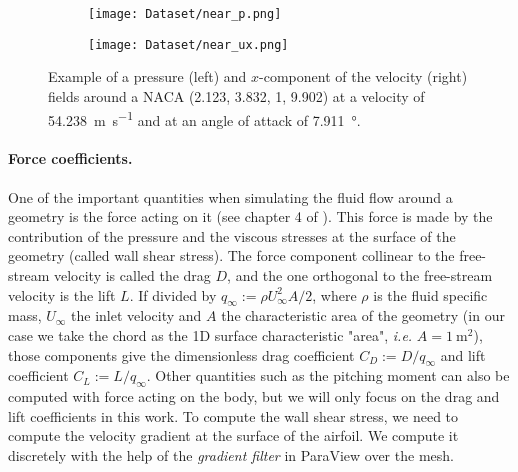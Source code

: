 \begin{figure}
	\centering
	\begin{subfigure}{0.49\textwidth}
		\centering
		\texttt{[image: Dataset/near\_p.png]}
	\end{subfigure}
	\begin{subfigure}{0.49\textwidth}
		\centering
		\texttt{[image: Dataset/near\_ux.png]}
	\end{subfigure}
	\caption{Example of a pressure (left) and $x$-component of the velocity (right) fields around a NACA (2.123, 3.832, 1, 9.902) at a velocity of \SI{54.238}{\meter\per\second} and at an angle of attack of \SI{7.911}{\degree}.}
	\label{fig:NACA_field}
\end{figure}

\paragraph{Force coefficients.} One of the important quantities when simulating the fluid flow around a geometry is the force acting on it (see chapter 4 of \cite{aero}). This force is made by the contribution of the pressure and the viscous stresses at the surface of the geometry (called wall shear stress). The force component collinear to the free-stream velocity is called the drag $D$, and the one orthogonal to the free-stream velocity is the lift $L$. If divided by $q_\infty := \rho U_\infty^2 A/2$, where $\rho$ is the fluid specific mass, $U_\infty$ the inlet velocity and $A$ the characteristic area of the geometry (in our case we take the chord as the 1D surface characteristic "area", \emph{i.e.} $A = \SI{1}{\square\meter}$), those components give the dimensionless drag coefficient $C_D := D/q_\infty$ and lift coefficient $C_L := L/q_\infty$. Other quantities such as the pitching moment can also be computed with force acting on the body, but we will only focus on the drag and lift coefficients in this work. To compute the wall shear stress, we need to compute the velocity gradient at the surface of the airfoil. We compute it discretely with the help of the \emph{gradient filter} in ParaView \cite{paraview} over the mesh.

